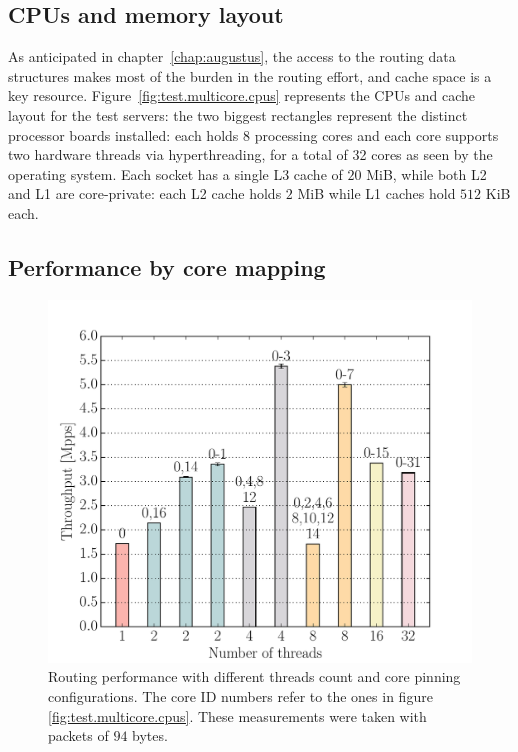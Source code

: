 \documentclass[11pt,a4paper,twoside,titlepage,openany]{book}
\begin{document}
\subsection{CPUs and memory layout}\label{sec:test.multicore.layout}
As anticipated in chapter~\ref{chap:augustus}, the access to the routing data structures makes most of the burden in the routing effort, and cache space is a key resource. Figure~\ref{fig:test.multicore.cpus} represents the CPUs and cache layout for the test servers: the two biggest rectangles represent the distinct processor boards installed: each holds $8$ processing cores and each core supports two hardware threads via hyperthreading, for a total of 32 cores as seen by the operating system.
Each socket has a single L3 cache of $20$ MiB, while both L2 and L1 are core-private: each L2 cache holds $2$ MiB while L1 caches hold $512$ KiB each.

\subsection{Performance by core mapping}\label{sec:test.multicore.performance}
\begin{figure}[tb]
  \begin{center}
    \includegraphics[width=.75\textwidth]{img/augustus_multithread.pdf}
    \caption[Routing performance with different threads count and core pinning]{Routing performance with different threads count and core pinning configurations. The core ID numbers refer to the ones in figure \ref{fig:test.multicore.cpus}. These measurements were taken with packets of $94$ bytes.}
    \label{fig:test.multicore.coremap}
  \end{center}
\end{figure}
\end{document}
